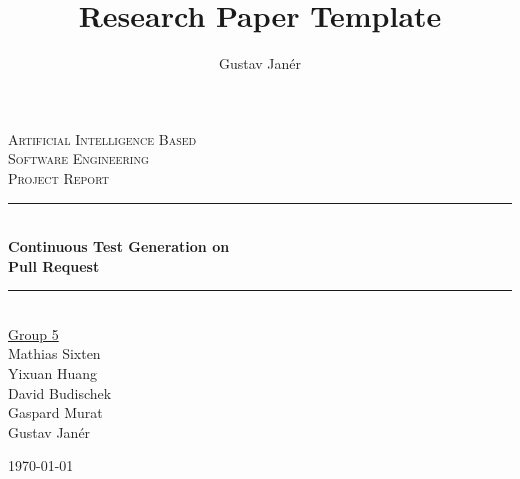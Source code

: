 \documentclass[12pt, a4paper]{article}
\title{Research Paper Template} %
\author{Gustav Janér}  %
\newcommand{\HRule}{\rule{\linewidth}{0.5mm}} %
\begin{document}
\begin{titlepage} 
\center 	     %


\textsc{\LARGE Artificial Intelligence Based\\[0.1cm] Software Engineering} \\[1cm]

\textsc{\Large Project Report}\\[0.5cm]


\HRule \\[0.2cm]
{ \huge \bfseries Continuous Test Generation on \\[0.1cm] Pull Request}\\[0.2cm] %
\HRule \\[1.0cm]
 

{\Large \underline{Group 5} \\
Mathias Sixten \\
Yixuan Huang  \\
David Budischek  \\
Gaspard Murat \\
Gustav Janér \\
} %

\vspace{0.3cm}
\today
\vspace{4cm}



\end{titlepage}
\end{document}
